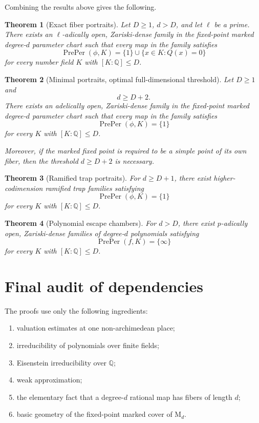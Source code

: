 \documentclass[11pt]{article}
\newtheorem{theorem}{Theorem}[section]
\begin{document}
Combining the results above gives the following.

\begin{theorem}[Exact fiber portraits]
Let \(D\ge1\), \(d>D\), and let \(\ell\) be a prime. There exists an \(\ell\)-adically open, Zariski-dense family in the fixed-point marked degree-\(d\) parameter chart such that every map in the family satisfies
\[
\operatorname{PrePer}(\phi,K)=\{1\}\cup\{x\in K:Q(x)=0\}
\]
for every number field \(K\) with \([K:\mathbb Q]\le D\).
\end{theorem}

\begin{theorem}[Minimal portraits, optimal full-dimensional threshold]
Let \(D\ge1\) and
\[
d\ge D+2.
\]
There exists an adelically open, Zariski-dense family in the fixed-point marked degree-\(d\) parameter chart such that every map in the family satisfies
\[
\operatorname{PrePer}(\phi,K)=\{1\}
\]
for every \(K\) with \([K:\mathbb Q]\le D\).

Moreover, if the marked fixed point is required to be a simple point of its own fiber, then the threshold \(d\ge D+2\) is necessary.
\end{theorem}

\begin{theorem}[Ramified trap portraits]
For \(d\ge D+1\), there exist higher-codimension ramified trap families satisfying
\[
\operatorname{PrePer}(\phi,K)=\{1\}
\]
for every \(K\) with \([K:\mathbb Q]\le D\).
\end{theorem}

\begin{theorem}[Polynomial escape chambers]
For \(d>D\), there exist \(p\)-adically open, Zariski-dense families of degree-\(d\) polynomials satisfying
\[
\operatorname{PrePer}(f,K)=\{\infty\}
\]
for every \(K\) with \([K:\mathbb Q]\le D\).
\end{theorem}

\section{Final audit of dependencies}

The proofs use only the following ingredients:
\begin{enumerate}
\item valuation estimates at one non-archimedean place;
\item irreducibility of polynomials over finite fields;
\item Eisenstein irreducibility over \(\mathbb Q\);
\item weak approximation;
\item the elementary fact that a degree-\(d\) rational map has fibers of length \(d\);
\item basic geometry of the fixed-point marked cover of \(\mathrm M_d\).
\end{enumerate}
\end{document}

